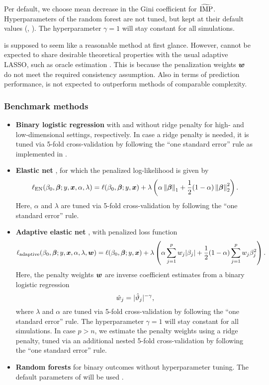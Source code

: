Per default, we choose mean decrease in the Gini coefficient for $\widetilde{\operatorname{IMP}}$.
Hyperparameters of the random forest are not tuned, but kept at their default
values (\eg {}, ). The hyperparameter $\gamma = 1$ will stay
constant for all simulations.

\ainet{} is supposed to seem like a reasonable method at first glance. However, 
\ainet{} cannot be expected to share desirable theoretical properties with the 
usual adaptive LASSO, such as oracle estimation \citep{Zou2006}. This is because 
the penalization weights $\text{\boldmath$w$}$ do not meet the required consistency assumption. 
Also in terms of prediction performance, \ainet{} is not expected to outperform 
methods of comparable complexity.

\subsubsection{Benchmark methods}

\begin{itemize}
   \item \textbf{Binary logistic regression} \citep{mccullagh2019generalized} 
   with and without ridge penalty for high- and
   low-dimensional settings, respectively. In case a ridge penalty is needed,
   it is tuned via 5-fold cross-validation by following the ``one standard
   error'' rule as implemented in  \citep{Friedman2010}. 
   \item \textbf{Elastic net} \citep{Zou2005}, for which the penalized 
   log-likelihood is given by
    $$\ell_{\text{EN}}(\beta_0, \text{\boldmath$\beta$}; y, \text{\boldmath$x$}, \alpha, \lambda) = 
      \ell(\beta_0, \text{\boldmath$\beta$}; y, \text{\boldmath$x$}) + \lambda\left(\alpha \left\lVert\text{\boldmath$\beta$}\right\rVert_1 + \frac{1}{2} (1-\alpha) \left\lVert\text{\boldmath$\beta$}\right\rVert_2^2 \right).$$
    Here, $\alpha$ and $\lambda$ are tuned via 5-fold cross-validation by following 
    the ``one standard error'' rule.
   \item \textbf{Adaptive elastic net} \citep{Zou2006}, with penalized loss function
    $$\ell_{\text{adaptive}}(\beta_0, \text{\boldmath$\beta$}; y, \text{\boldmath$x$}, \alpha, \lambda, \text{\boldmath$w$})
    = \ell(\beta_0, \text{\boldmath$\beta$}; y, \text{\boldmath$x$}) + \lambda\left(\alpha \sum_{j = 1}^p{w_j\lvert\beta_j\rvert} + \frac{1}{2} (1-\alpha) \sum_{j=1}^p{w_j\beta_j^2} \right).$$
    Here, the penalty weights $\text{\boldmath$w$}$ are inverse coefficient estimates from a
    binary logistic regression
    $$\hat{w}_j = \lvert\hat{\vartheta}_j\rvert^{-\gamma},$$
    where $\lambda$ and $\alpha$ are tuned via 5-fold cross-validation by 
    following the ``one standard error'' rule.
    The hyperparameter $\gamma = 1$ will stay constant for all simulations.
    In case $p > n$, we estimate the penalty weights using a ridge penalty, tuned
    via an additional nested 5-fold cross-validation
    by following the ``one standard error'' rule.
    \item \textbf{Random forests} \citep{Breiman2001} for binary outcomes without 
    hyperparameter tuning. The default parameters of  will be used 
    \citep{ranger2017}. %
\end{itemize}



